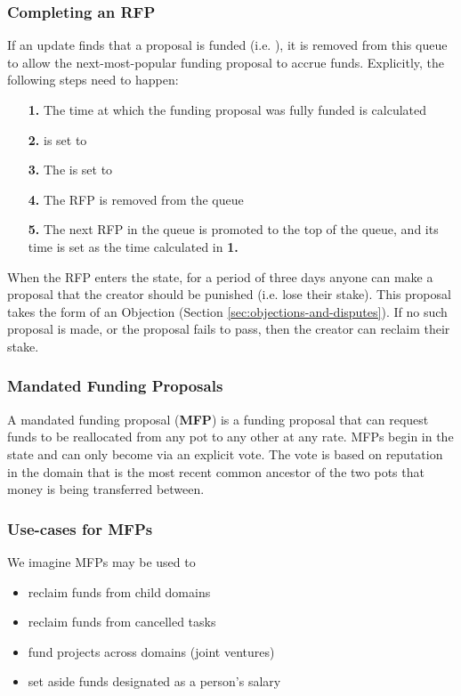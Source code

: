 \subsubsection*{Completing an RFP}
If an update finds that a proposal is funded (i.e. ), it is removed from this queue to allow the next-most-popular funding proposal to accrue funds. Explicitly, the following steps need to happen:
\begin{itemize}
 \item[\textbf{1.}] The time at which the funding proposal was fully funded is calculated%
 \item[\textbf{2.}]  is set to 
 \item[\textbf{3.}] The  is set to 
 \item[\textbf{4.}] The RFP is removed from the queue
 \item[\textbf{5.}] The next RFP in the queue is promoted to the top of the queue, and its  time is set as the time calculated in \textbf{1.}
\end{itemize}


When the RFP enters the  state, for a period of three days anyone can make a proposal that the creator should be punished (i.e. lose their stake). This proposal takes the form of an Objection (Section \ref{sec:objections-and-disputes}). If no such proposal is made, or the proposal fails to pass, then the creator can reclaim their stake.




\subsubsection{Mandated Funding Proposals}
A mandated funding proposal (\textbf{MFP}) is a funding proposal that can request funds to be reallocated from any pot to any other at any rate. MFPs begin in the  state and can only become  via an explicit vote. The vote is based on reputation in the domain that is the most recent common ancestor of the two pots that money is being transferred between.

\subsubsection*{Use-cases for MFPs}
We imagine MFPs may be used to
\begin{itemize}
 \item reclaim funds from child domains
 \item reclaim funds from cancelled tasks
 \item fund projects across domains (joint ventures)
 \item set aside funds designated as a person's salary
 \end{itemize}


